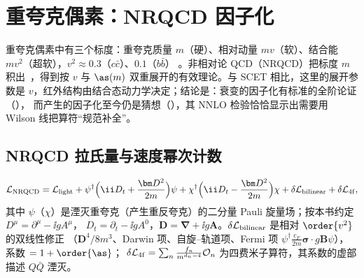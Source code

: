 
\section{重夸克偶素：NRQCD 因子化}\label{sec:nrqcd}

重夸克偶素中有三个标度：重夸克质量 $m$（硬）、相对动量 $mv$（软）、结合能 $mv^2$（超软），$v^2\approx0.3$（$c\bar c$）、$0.1$（$b\bar b$）
\cite{BodwinBraatenLepage1995}。非相对论 QCD（NRQCD）把标度 $m$ 积出~\cite{CaswellLepage1986,BodwinBraatenLepage1995}，得到按 $v$ 与 $\as(m)$
双重展开的有效理论。与 SCET 相比，这里的展开参数是 $v$，红外结构由结合态动力学决定；结论是：衰变的因子化有标准的全阶论证（\tagA），
而产生的因子化至今仍是猜想（\tagC），其 NNLO 检验恰恰显示出需要用 Wilson 线把算符“规范补全”。

\subsection{NRQCD 拉氏量与速度幂次计数}

\begin{definition}\label{def:nrqcd}
\begin{equation}\label{eq:nrqcd-L}
\mathcal L_{\rm NRQCD}=\mathcal L_{\rm light}+\psi^\dagger\Big(\ii D_t+\frac{\bm D^2}{2m}\Big)\psi+\chi^\dagger\Big(\ii D_t-\frac{\bm D^2}{2m}\Big)\chi
+\delta\mathcal L_{\rm bilinear}+\delta\mathcal L_{\rm 4f},
\end{equation}
其中 $\psi$（$\chi$）是湮灭重夸克（产生重反夸克）的二分量 Pauli 旋量场；按本书约定 $D^\mu=\partial^\mu-\ii gA^\mu$，
$D_t=\partial_t-\ii gA^0$，$\bm D=\bm\nabla+\ii g\bm A$。$\delta\mathcal L_{\rm bilinear}$ 是相对 $\order{v^2}$ 的双线性修正
（$\bm D^4/8m^3$、Darwin 项、自旋–轨道项、Fermi 项 $\psi^\dagger\frac{c_F}{2m}\bm\sigma\cdot g\bm B\psi$），系数 $=1+\order{\as}$；
$\delta\mathcal L_{\rm 4f}=\sum_n\frac{f_n}{m^{d_n-4}}\mathcal O_n$ 为四费米子算符，其系数的虚部描述 $Q\bar Q$ 湮灭。
\end{definition}

